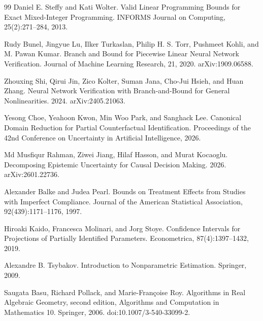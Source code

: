 \documentclass{article}
\begin{document}
\begin{thebibliography}{99}
   Daniel E. Steffy and Kati Wolter. Valid Linear Programming Bounds for Exact Mixed-Integer Programming. INFORMS Journal on Computing, 25(2):271--284, 2013.

   Rudy Bunel, Jingyue Lu, Ilker Turkaslan, Philip H. S. Torr, Pushmeet Kohli, and M. Pawan Kumar. Branch and Bound for Piecewise Linear Neural Network Verification. Journal of Machine Learning Research, 21, 2020. arXiv:1909.06588.

   Zhouxing Shi, Qirui Jin, Zico Kolter, Suman Jana, Cho-Jui Hsieh, and Huan Zhang. Neural Network Verification with Branch-and-Bound for General Nonlinearities. 2024. arXiv:2405.21063.

   Yesong Choe, Yeahoon Kwon, Min Woo Park, and Sanghack Lee. Canonical Domain Reduction for Partial Counterfactual Identification. Proceedings of the 42nd Conference on Uncertainty in Artificial Intelligence, 2026.

   Md Musfiqur Rahman, Ziwei Jiang, Hilaf Hasson, and Murat Kocaoglu. Decomposing Epistemic Uncertainty for Causal Decision Making. 2026. arXiv:2601.22736.

   Alexander Balke and Judea Pearl. Bounds on Treatment Effects from Studies with Imperfect Compliance. Journal of the American Statistical Association, 92(439):1171--1176, 1997.

   Hiroaki Kaido, Francesca Molinari, and Jorg Stoye. Confidence Intervals for Projections of Partially Identified Parameters. Econometrica, 87(4):1397--1432, 2019.

   Alexandre B. Tsybakov. Introduction to Nonparametric Estimation. Springer, 2009.

   Saugata Basu, Richard Pollack, and Marie-Fran\c{c}oise Roy. Algorithms in Real Algebraic Geometry, second edition, Algorithms and Computation in Mathematics 10. Springer, 2006. doi:10.1007/3-540-33099-2.

\end{thebibliography}
\end{document}
